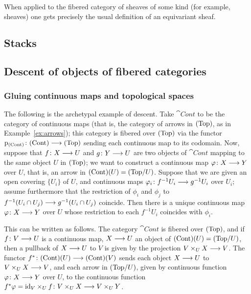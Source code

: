 \begin{3   FIBERED CATEGORIES}
\begin{3.8 Equivariant objects in fibcats}
\begin{proposition}
\end{proposition}

When applied to the fibered category of sheaves of some kind (for example, \qc sheaves) one gets precisely the usual definition of an equivariant sheaf.


\end{3.8 Equivariant objects in fibcats}
\end{3   FIBERED CATEGORIES}
\begin{4   STACKS}
\setcounter{chapter}{3}
\chapter{Stacks}\label{ch:stacks}
\begin{4.1 Descent of objects of fibcats}
\setcounter{section}{0}
\section{Descent of objects of fibered categories}
\setcounter{theorem}{0}
\subsection{Gluing continuous maps and topological spaces}

The  following is the archetypal example of descent.
Take $\cat{Cont}$ to be the category of continuous maps (that is, the category of arrows in $(\mathrm{Top})$, as in Example~\ref{ex:arrows}); this category is fibered over $(\mathrm{Top})$ via the functor $\p_{\cat{Cont}} \colon \cat{Cont} \arr \cattop$ sending each continuous map to its codomain. Now, suppose that $f \colon X \arr U$ and $g \colon Y \arr U$ are two objects of $\cat{Cont}$ mapping to the same object $U$ in $(\mathrm{Top})$; we want to construct a continuous map $\phi\colon X \arr Y$ over $U$, that is, an arrow in $(\mathrm{Cont})(U) = ({\mathrm{Top}/U})$. Suppose that we are given an open covering $\{U_i\}$ of $U$, and continuous maps $\phi_i \colon f^{-1} U_i \arr g^{-1} U_i$ over $U_i$; assume furthermore that the restriction of $\phi_i$ and $\phi_j$ to $f ^{-1}(U_i \cap U_j) \arr g^{-1}(U_i \cap U_j)$ coincide. Then there is a unique continuous map $\phi \colon X \arr Y$ over $U$ whose restriction to each $f^{-1}U_i$ coincides with $\phi_i$.

This can be written as follows. The category $\cat{Cont}$ is fibered over $(\mathrm{Top})$, and if $f\colon V \arr U$ is a continuous map, $X \arr U$ an object of $(\mathrm{Cont}) (U) = ({\mathrm{Top}/U})$, then a pullback of $X \arr U$ to $V$ is given by the projection $V \times_U X \arr V$. The functor $f^* \colon \cat{Cont}(U) \arr \cat{Cont}(V)$ sends each object $X \arr U$ to $V \times_U X \arr V$, and each arrow in $({\mathrm{Top}/U})$, given by  continuous function $\phi\colon X \arr Y$ over $U$, to the continuous function $f^* \phi = \id_V \times_U f \colon V \times_U X \arr V \times_U Y$. 


\end{4.1 Descent of objects of fibcats}
\end{4   STACKS}
